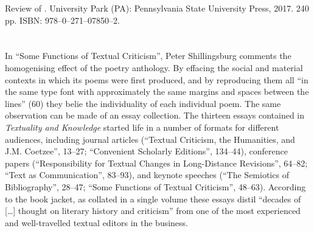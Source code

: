 


\begin{review}
\renewcommand*{\pagemark}{}


\begin{reviewed-wider}
Review of \thecontribution. University Park (PA): Pennsylvania State University Press, 2017. 240 pp. ISBN: 978--0--271--07850--2.
\end{reviewed-wider}

\section*{} 

In ``Some Functions of Textual Criticism'', Peter Shillingsburg comments
the homogenising effect of the poetry anthology. By effacing the social
and material contexts in which its poems were first produced, and by
reproducing them all ``in the same type font with approximately the same
margins and spaces between the lines'' (60) they belie the individuality
of each individual poem. The same observation can be made of an essay
collection. The thirteen essays contained in \emph{Textuality and
Knowledge} started life in a number of formats for different audiences,
including journal articles (``Textual Criticism, the Humanities, and
J.M. Coetzee'', 13--27; ``Convenient Scholarly Editions'', 134--44),
conference papers (``Responsibility for Textual Changes in Long-Distance
Revisions'', 64--82; ``Text as Communication'', 83--93), and keynote
speeches (``The Semiotics of Bibliography'', 28--47; ``Some Functions of
Textual Criticism'', 48--63). According to the book jacket, as collated
in a single volume these essays distil ``decades of {[}\dots{}{]} thought
on literary history and criticism'' from one of the most experienced and
well-travelled textual editors in the business.


\end{review}
